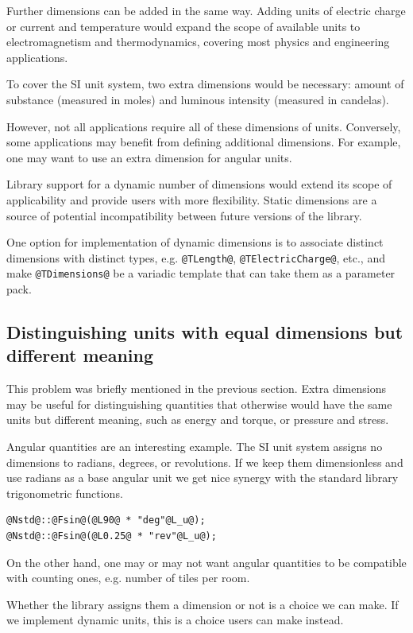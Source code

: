 \documentclass[11pt,letterpaper]{article}
\begin{document}
Further dimensions can be added in the same way.
Adding units of electric charge or current and temperature would expand the scope of available
units to electromagnetism and thermodynamics, covering most physics and engineering
applications.

To cover the SI unit system, two extra dimensions would be necessary:
amount of substance (measured in moles) and luminous intensity (measured in candelas).

However, not all applications require all of these dimensions of units.
Conversely, some applications may benefit from defining additional dimensions.
For example, one may want to use an extra dimension for angular units.

Library support for a dynamic number of dimensions would extend its scope of applicability
and provide users with more flexibility.
Static dimensions are a source of potential incompatibility between future versions of the library.

One option for implementation of dynamic dimensions is to associate distinct dimensions with
distinct types, e.g. \lstinline{@TLength@}, \lstinline{@TElectricCharge@}, etc.,
and make \lstinline{@TDimensions@} be a variadic template that can take them as a
parameter pack.

\subsection{Distinguishing units with equal dimensions but different meaning} %

This problem was briefly mentioned in the previous section.
Extra dimensions may be useful for distinguishing quantities that otherwise would have
the same units but different meaning, such as energy and torque, or pressure and stress.

Angular quantities are an interesting example.
The SI unit system assigns no dimensions to radians, degrees, or revolutions.
If we keep them dimensionless and use radians as a base angular unit we get
nice synergy with the standard library trigonometric functions.
%
\begin{lstlisting}
@Nstd@::@Fsin@(@L90@ * "deg"@L_u@);
@Nstd@::@Fsin@(@L0.25@ * "rev"@L_u@);
\end{lstlisting}

On the other hand,  one may or may not want angular quantities to be compatible with counting ones,
e.g. number of tiles per room.

Whether the library assigns them a dimension or not is a choice we can make.
If we implement dynamic units, this is a choice users can make instead.
\end{document}
